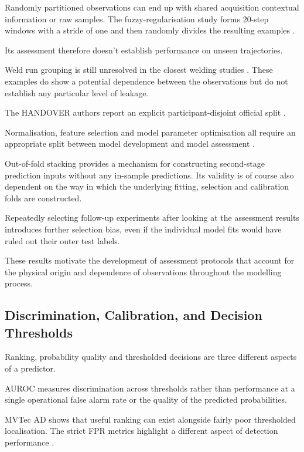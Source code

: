 Randomly partitioned observations can end up with shared acquisition contextual information or raw
samples. The fuzzy-regularisation study forms 20-step windows with a stride of one and then randomly
divides the resulting examples \parencite[pp.~4--5]{altinses_deep_2023}.

Its assessment therefore doesn't establish performance on unseen trajectories.

Weld run grouping is still unresolved in the closest welding studies \parencite{fan_dmaw_2026,hua_anti-interference_2026}. These
examples do show a potential dependence between the observations but do not establish any particular
level of leakage.

The HANDOVER authors report an explicit participant-disjoint official split \parencite{thoduka_multimodal_2024}.

Normalisation, feature selection and model parameter optimisation all require an appropriate split
between model development and model assessment \parencite{varma_bias_2006,kapoor_leakage_2023}.

Out-of-fold stacking provides a mechanism for constructing second-stage prediction inputs without
any in-sample predictions. Its validity is of course also dependent on the way in which the
underlying fitting, selection and calibration folds are constructed.

Repeatedly selecting follow-up experiments after looking at the assessment results introduces
further selection bias, even if the individual model fits would have ruled out their outer test
labels.

These results motivate the development of assessment protocols that account for the physical origin
and dependence of observations throughout the modelling process.

\subsection{Discrimination, Calibration, and Decision Thresholds}

Ranking, probability quality and thresholded decisions are three different aspects of a predictor.

AUROC measures discrimination across thresholds rather than performance at a single operational
false alarm rate or the quality of the predicted probabilities.

MVTec AD shows that useful ranking can exist alongside fairly poor thresholded localisation. The
strict FPR metrics highlight a different aspect of detection performance
\parencite{bergmann_mvtec_2019,costanzino_multimodal_2024,cheng_multimodal_2025}.

